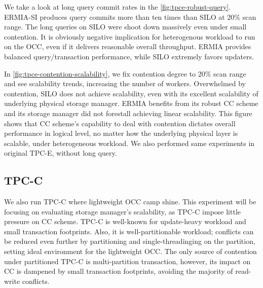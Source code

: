 We take a look at long query commit rates in the \ref{fig:tpce-robust-query}. ERMIA-SI produces query commits more than ten times than SILO at 20\% scan range. %
The long queries on SILO were shoot down massively even under small contention. It is obviously negative implication for heterogenous workload to run on the OCC, even if it delivers reasonable overall throughput. ERMIA provides balanced query/transaction performance, while SILO extremely favors updaters.

In \ref{fig:tpce-contention-scalability}, we fix contention degree to 20\% scan range and see scalability trends, increasing the number of workers. Overwhelmed by contention, SILO does not achieve scalability, even with its excellent scalability of underlying physical storage manager. ERMIA benefits from its robust CC scheme and its storage manager did not forestall achieving linear scalability. This figure shows that CC scheme's capability to deal with contention dictates overall performance in logical level, no matter how the underlying physical layer is scalable, under heterogeneous workload. We also performed same experiments in original TPC-E, without long query. %

\subsection{TPC-C} 
We also run TPC-C where lightweight OCC camp shine. This experiment will be focusing on evaluating storage manager's scalability, as TPC-C impose little pressure on CC scheme. TPC-C is well-known for update-heavy workload and small transaction footprints. Also, it is well-partitionable workload; conflicts can be reduced even further by partitioning and single-threadinging on the partition, setting ideal environment for the lightweight OCC. The only source of contention under partitioned TPC-C is multi-partition transaction, however, its impact on CC is dampened by small transaction footprints, avoiding the majority of read-write conflicts. %

